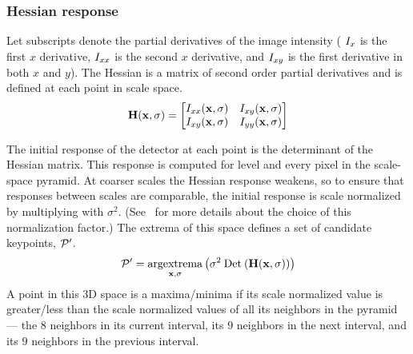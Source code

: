         \subsubsection{Hessian response}
            Let subscripts denote the partial derivatives of the image intensity (\eg{} $I_{x}$ is the first $x$
            derivative, $I_{xx}$ is the second $x$ derivative, and $I_{xy}$ is the first derivative in both
            $x$ and $y$). The Hessian is a matrix of second order partial derivatives and is defined at each point
            in scale space.
            \begin{equation}
                \mathbf{H}(\mathbf{x}, \sigma) = 
                 \left[ \begin{matrix} 
                I_{xx}(\mathbf{x}, \sigma) & I_{xy}(\mathbf{x}, \sigma) \\
                I_{xy}(\mathbf{x}, \sigma) & I_{yy}(\mathbf{x}, \sigma)  \end{matrix} \right]  
            \end{equation}\label{eqn:hessianmatrix}  

            The initial response of the detector at each point is the determinant of the Hessian matrix. This
            response is computed for level and every pixel in the scale-space pyramid. At coarser scales the
            Hessian response weakens, so to ensure that responses between scales are comparable, the initial
            response is scale normalized by multiplying with $\sigma^2$. (See~\cite{lindeberg_feature_1998} for
            more details about the choice of this normalization factor.) The extrema of this space defines a set of
            candidate keypoints, $\mathcal{P}'$.
            \begin{equation}
                \mathcal{P}' = \underset{\mathbf{x},\sigma}{\operatorname{argextrema}} \left(\sigma^2 \mathbin{\textrm{Det}}\left(\mathbf{H}(\mathbf{x}, \sigma)\right)\right) 
            \end{equation}
            A point in this 3D space is a maxima/minima if its scale normalized value is greater/less than the
            scale normalized values of all its neighbors in the pyramid --- \ie{} the $8$ neighbors in its current
            interval, its $9$ neighbors in the next interval, and its $9$ neighbors in the previous interval.

